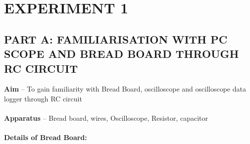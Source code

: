 \documentclass[11pt]{scrreprt}
\begin{document}




\chapter*{\Large EXPERIMENT 1}
\setcounter{chapter}{1}
\section*{\normalsize PART A: FAMILIARISATION WITH PC SCOPE AND BREAD BOARD THROUGH
RC CIRCUIT}
\textbf{Aim} – To gain familiarity with Bread Board, oscilloscope and oscilloscope data logger through RC circuit\\
\\
\textbf{Apparatus} – Bread board, wires, Oscilloscope, Resistor, capacitor\\
\\
\textbf{Details of Bread Board:}
\end{document}
